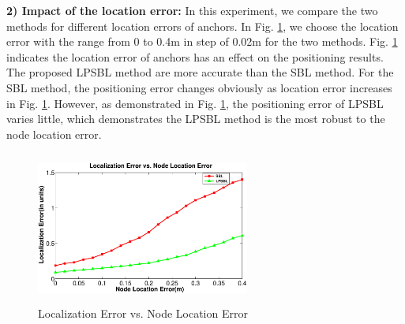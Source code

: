 \textbf{2) Impact of the location error:}
 In this experiment, we compare the two methods for different location errors of anchors. 
 In Fig. \ref{fig5}, we choose the location error with the range from 0 to 0.4m in step of 0.02m for the two methods. 
 Fig. \ref{fig5} indicates the location error of anchors has an effect on the positioning results. 
 The proposed LPSBL method are more accurate than the SBL method. 
 For the SBL method, the positioning error changes obviously as location error increases in Fig. \ref{fig5}. 
 However, as demonstrated in Fig. \ref{fig5}, the positioning error of LPSBL varies little, which demonstrates the LPSBL method is the most robust to the node location error.
  \begin{figure}[htb]
		   \vspace{-25mm}
			 \includegraphics[height=5.0cm,width=7.0cm]{image/fig5.eps}
            \vspace{25mm}
            \caption{Localization Error vs. Node Location Error}
             \vspace{-5mm}
             \label{fig5}
        \end{figure}

